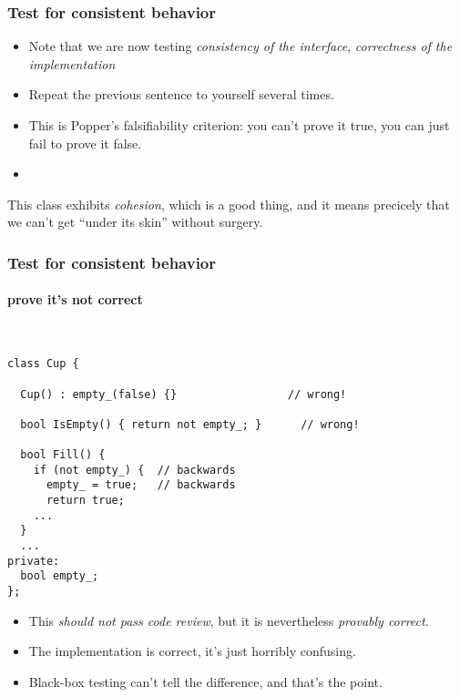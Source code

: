 \begin{frame}[fragile,t]
\frametitle{Test for consistent behavior}

\begin{itemize}
\item Note that we are now testing \emph{consistency of the
  interface},  \emph{correctness of the implementation}
\item Repeat the previous sentence to yourself several times.
\item This is Popper's falsifiability criterion: you can't prove it
  true, you can just fail to prove it false.
\item {}
\end{itemize}

This class exhibits \emph{cohesion}, which is a good thing, and it
means precicely that we can't get ``under its skin'' without surgery.

\begin{center}
\end{center}

\end{frame}

\begin{frame}[fragile,t]
\frametitle{Test for consistent behavior}
\framesubtitle{prove it's not correct}
{\scriptsize\
\begin{verbatim}
class Cup {

  Cup() : empty_(false) {}                 // wrong!

  bool IsEmpty() { return not empty_; }      // wrong!

  bool Fill() { 
    if (not empty_) {  // backwards
      empty_ = true;   // backwards
      return true;
    ...
  }
  ...
private:
  bool empty_;
};
\end{verbatim}}
\vskip 6pt
\begin{itemize}
\item This \emph{should not pass code review}, but it is nevertheless
\emph{provably correct}.

\item The implementation is correct, it's just horribly confusing.

\item Black-box testing can't tell the difference, and that's the point.
\end{itemize}
\end{frame}



